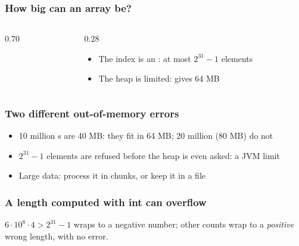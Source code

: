 \documentclass[aspectratio=169,10pt,compress]{beamer}
\begin{document}




\begin{frame}[t,fragile] \frametitle{How big can an array be?}
	\begin{columns}[T]
		\begin{column}{0.70\textwidth}
		\end{column}
		\begin{column}{0.28\textwidth}
			\begin{itemize}\small
				\item The index is an : at most $2^{31} - 1$ elements
				\item The heap is limited:  gives 64 MB
			\end{itemize}
		\end{column}
	\end{columns}

	\vspace{0.5em}
	\small {}
\end{frame}




\begin{frame}[t,fragile] \frametitle{Two different out-of-memory errors}

	\begin{itemize}\small
		\item 10 million s are 40 MB: they fit in 64 MB; 20 million (80 MB) do not
		\item $2^{31} - 1$ elements are refused before the heap is even asked: a JVM limit
		\item Large data: process it in chunks, or keep it in a file
	\end{itemize}
\end{frame}




\begin{frame}[t,fragile] \frametitle{A length computed with int can overflow}

	\footnotesize $6 \cdot 10^{8} \cdot 4 > 2^{31} - 1$ wraps to a negative number; other counts wrap to a \emph{positive} wrong length, with no error.
\end{frame}
\end{document}
